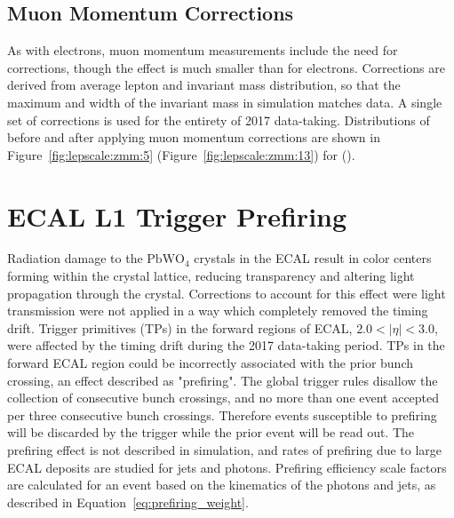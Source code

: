 



\subsection{Muon Momentum Corrections}
As with electrons, muon momentum measurements include the need for corrections, though the effect is much smaller than for electrons. Corrections are derived from average lepton \pt and \zmm invariant mass distribution, so that the maximum and width of the \zmm invariant mass in simulation matches data\cite{Bodek:2012id}.  A single set of corrections is used for the entirety of 2017 data-taking. Distributions of \zmm \mll before and after applying muon momentum corrections are shown in Figure~\ref{fig:lepscale:zmm:5} (Figure~\ref{fig:lepscale:zmm:13}) for \sg (\sh).






\section{ECAL L1 Trigger Prefiring}\label{ch:prefire}

Radiation damage to the $\mathrm{PbWO_4}$ crystals in the ECAL result in color centers forming within the crystal lattice, reducing transparency and altering light propagation through the crystal. Corrections to account for this effect were light transmission were not applied in a way which completely removed the timing drift. Trigger primitives (TPs) in the forward regions of ECAL, $2.0 < |\eta| < 3.0$, were affected by the timing drift during the 2017 data-taking period. TPs in the forward ECAL region could be incorrectly associated with the prior bunch crossing, an effect described as "prefiring". The global trigger rules disallow the collection of consecutive bunch crossings, and no more than one event accepted per three consecutive bunch crossings. Therefore events susceptible to prefiring will be discarded by the trigger while the prior event will be read out.
The prefiring effect is not described in simulation, and rates of prefiring due to large ECAL deposits are studied for jets and photons. Prefiring efficiency scale factors are calculated for an event based on the kinematics of the photons and jets, as described in Equation~\ref{eq:prefiring_weight}.

